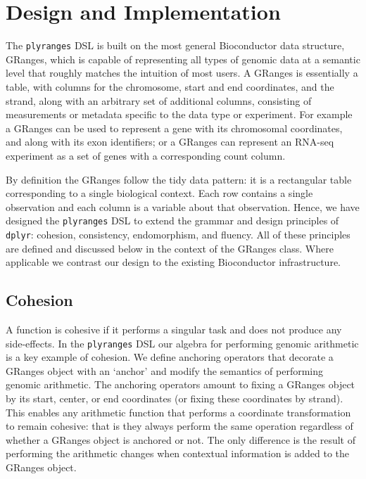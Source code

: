 \documentclass[10pt,letterpaper]{article}
\begin{document}
\section{Design and Implementation}\label{design-and-implementation}

The \texttt{plyranges} DSL is built on the most general Bioconductor
data structure, GRanges, which is capable of representing all types of
genomic data at a semantic level that roughly matches the intuition of
most users. A GRanges is essentially a table, with columns for the
chromosome, start and end coordinates, and the strand, along with an
arbitrary set of additional columns, consisting of measurements or
metadata specific to the data type or experiment. For example a GRanges
can be used to represent a gene with its chromosomal coordinates, and
along with its exon identifiers; or a GRanges can represent an RNA-seq
experiment as a set of genes with a corresponding count column.

By definition the GRanges follow the tidy data pattern: it is a
rectangular table corresponding to a single biological context. Each row
contains a single observation and each column is a variable about that
observation. Hence, we have designed the \texttt{plyranges} DSL to
extend the grammar and design principles of \texttt{dplyr}: cohesion,
consistency, endomorphism, and fluency. All of these principles are
defined and discussed below in the context of the GRanges class. Where
applicable we contrast our design to the existing Bioconductor
infrastructure.

\subsection{Cohesion}\label{cohesion}

A function is cohesive if it performs a singular task and does not
produce any side-effects. In the \texttt{plyranges} DSL our algebra for
performing genomic arithmetic is a key example of cohesion. We define
anchoring operators that decorate a GRanges object with an `anchor' and
modify the semantics of performing genomic arithmetic. The anchoring
operators amount to fixing a GRanges object by its start, center, or end
coordinates (or fixing these coordinates by strand). This enables any
arithmetic function that performs a coordinate transformation to remain
cohesive: that is they always perform the same operation regardless of
whether a GRanges object is anchored or not. The only difference is the
result of performing the arithmetic changes when contextual information
is added to the GRanges object.
\end{document}
